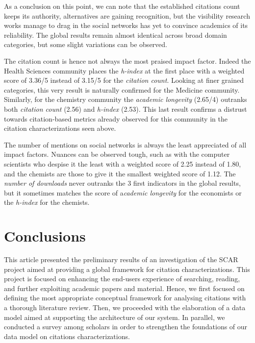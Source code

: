 \documentclass[runningheads,a4paper]{llncs}
\begin{document}
As a conclusion on this point, we can note that the established citations count keeps its authority, alternatives are gaining recognition, but the visibility research works manage to drag in the social networks has yet to convince academics of its reliability. The global results remain almost identical across broad domain categories, but some slight variations can be observed.

The citation count is hence not always the most praised impact factor. Indeed the Health Sciences community places the {\em h-index} at the first place with a weighted score of 3.36/5 instead of 3.15/5 for the {\em citation count}. Looking at finer grained categories, this very result is naturally confirmed for the Medicine community. Similarly, for the chemistry community the {\em academic longevity} (2.65/4) outranks both {\em citation count} (2.56) and {\em h-index} (2.53). This last result confirms a distrust towards citation-based metrics already observed for this community in the citation characterizations seen above.

The number of mentions on social networks is always the least appreciated of all impact factors. Nuances can be observed tough, such as with the computer scientists who despise it the least with a weighted score of 2.25 instead of 1.80, and the chemists are those to give it the smallest weighted score of 1.12. The {\em number of downloads} never outranks the 3 first indicators in the global results, but it sometimes matches the score of a{\em cademic longevity }for the economists or the {\em h-index} for the chemists.

\section{Conclusions}\label{__RefHeading__183531_273733062}

This article presented the preliminary results of an investigation of the SCAR project aimed at providing a global framework for citation characterizations. This project is focused on enhancing the end-users experience of searching, reading, and further exploiting academic papers and material. Hence, we first focused on defining the most appropriate conceptual framework for analysing citations with a thorough literature review. Then, we proceeded with the elaboration of a data model aimed at supporting the architecture of our system. In parallel, we conducted a survey among scholars in order to strengthen the foundations of our data model on citations characterizations.
\end{document}
